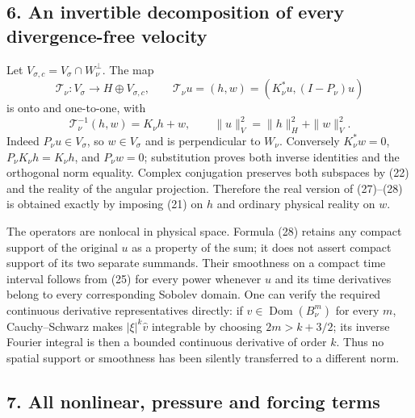 \subsection*{6. An invertible decomposition of every divergence-free velocity}

Let \(V_{\sigma,c}=V_\sigma\cap W_\nu^\perp\). The map \[
\mathcal T_\nu:V_\sigma\longrightarrow H\oplus V_{\sigma,c},\qquad
\mathcal T_\nu u=(h,w)=(K_\nu^*u,(I-P_\nu)u)
\tag{27}
\] is onto and one-to-one, with \[
\mathcal T_\nu^{-1}(h,w)=K_\nu h+w,
\qquad\|u\|_V^2=\|h\|_H^2+\|w\|_V^2.
\tag{28}
\] Indeed \(P_\nu u\in V_\sigma\), so \(w\in V_\sigma\) and is perpendicular to \(W_\nu\). Conversely \(K_\nu^*w=0\), \(P_\nu K_\nu h=K_\nu h\), and \(P_\nu w=0\); substitution proves both inverse identities and the orthogonal norm equality. Complex conjugation preserves both subspaces by (22) and the reality of the angular projection. Therefore the real version of (27)--(28) is obtained exactly by imposing (21) on \(h\) and ordinary physical reality on \(w\).

The operators are nonlocal in physical space. Formula (28) retains any compact support of the original \(u\) as a property of the sum; it does not assert compact support of its two separate summands. Their smoothness on a compact time interval follows from (25) for every power whenever \(u\) and its time derivatives belong to every corresponding Sobolev domain. One can verify the required continuous derivative representatives directly: if \(v\in\operatorname{Dom}(B_\nu^m)\) for every \(m\), Cauchy--Schwarz makes \(|\xi|^k\widehat v\) integrable by choosing \(2m>k+3/2\); its inverse Fourier integral is then a bounded continuous derivative of order \(k\). Thus no spatial support or smoothness has been silently transferred to a different norm.

\subsection*{7. All nonlinear, pressure and forcing terms}

